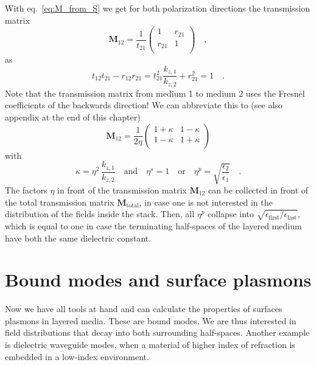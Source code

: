 With eq.~\ref{eq:M_from_S} we get for both polarization directions the transmission matrix
\begin{equation}
\mathbf{M}_{12} = \frac{1}{t_{21}} 
\begin{pmatrix}
1 & r_{21} \\ r_{21} & 1 \\
\end{pmatrix} \quad ,
\end{equation}
as 
\begin{equation}
t_{12} t_{21} - r_{12}r_{21} = t_{21}^2 \frac{k_{z,1}}{k_{z,2}} + r_{21}^2 = 1 \quad . 
\end{equation}
Note that the transmission matrix from medium 1 to medium 2 uses the Fresnel coefficients of the backwards direction!
We can abbreviate this to (see also appendix at the end of this chapter)
\begin{equation}
\mathbf{M}_{12} 
=\frac{ 1}{2 \eta }
\begin{pmatrix}
1 + \kappa & 1  -\kappa \\  1  - \kappa  & 1 + \kappa \\
\end{pmatrix} \label{eq:M_kappa}
\end{equation}
with 
\begin{equation}
\kappa = \eta^2 \,
\frac{  k_{z,1} }{ k_{z,2}}
\quad
\text{and}
\quad
\eta^s = 1 \quad \text{or} \quad \eta^p = \sqrt{ \frac{\epsilon_2}{\epsilon_1} } \quad . 
\end{equation}
The factors $\eta$ in front of the transmission matrix $\mathbf{M}_{12} $ can be collected in front of the total transmission matrix $\mathbf{M}_\text{total}$, in case one is not interested in the distribution of the fields inside the stack. Then, all $\eta^p$ collapse into $\sqrt{\epsilon_\text{first} / \epsilon_\text{last}}$, which is equal to one in case the terminating half-spaces of the layered medium have both the same dielectric constant. 



\section{Bound modes and surface plasmons}

Now we have all tools at hand and can calculate the properties of surfaces plasmons in layered media. These are bound modes. We are thus interested in field distributions that decay into both surrounding half-spaces. Another example is dielectric waveguide modes, when a material of higher index of refraction is embedded in a low-index environment.

